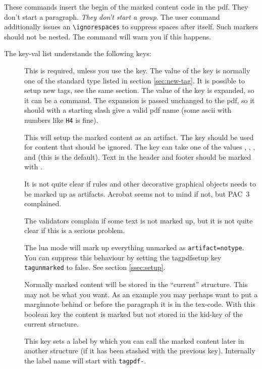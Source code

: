 \documentclass[DIV=12,parskip=half-,bibliography=totoc]{scrartcl}
\begin{document}
These commands insert the begin of the marked content code in the pdf. They don't start a paragraph. \emph{They don't start a group}. The user command additionally issues an \verb+\ignorespaces+ to suppress spaces after itself.
Such markers should not be nested. The command will warn you if this happens.

The key-val list understands the following keys:
\begin{description}
  \item[] This is required, unless you use the  key. The value of the key is normally one of the standard type listed in section \ref{sec:new-tag}. It is possible to setup new tags, see the same section. The value of the key is expanded, so it can be a command. The expansion is passed unchanged to the pdf, so it should with a starting slash give a valid pdf name  (some ascii with numbers like \texttt{H4} is fine).

  \item[] This will setup the marked content as an artifact. The key should be used for content that should be ignored. The key can take one of the values , ,  ,   and  (this is the default). Text in the header and footer should be marked with .

      It is not quite clear if rules and other decorative graphical objects needs to be marked up as artifacts. Acrobat seems not to mind if not, but PAC~3 complained.

      The validators complain if some text is not marked up, but it is not quite clear if this is a serious problem.

      The lua mode will mark up everything unmarked as \texttt{artifact=notype}. You can suppress this behaviour by setting the tagpdfsetup key \texttt{tagunmarked} to false. See section \ref{ssec:setup}.

  \item[] Normally marked content will be stored in the \enquote{current} structure. This may not be what you want. As an example you may perhaps want to put a marginnote behind or before the paragraph it is in the tex-code. With this boolean key the content is marked but not stored in the kid-key of the current  structure.

  \item[] This key sets a label by which you can call the marked content later in another structure (if it has been stashed with the previous key). Internally the label name will start with \texttt{tagpdf-}.


\end{description}
\end{document}
